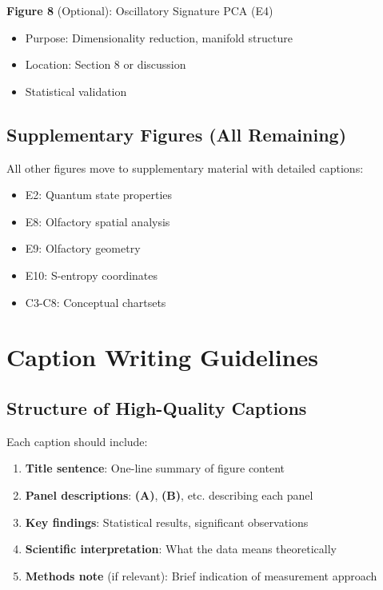 \documentclass[11pt]{article}
\begin{document}
\textbf{Figure 8} (Optional): Oscillatory Signature PCA (E4)
\begin{itemize}
\item Purpose: Dimensionality reduction, manifold structure
\item Location: Section 8 or discussion
\item Statistical validation
\end{itemize}

\subsection{Supplementary Figures (All Remaining)}

All other figures move to supplementary material with detailed captions:
\begin{itemize}
\item E2: Quantum state properties
\item E8: Olfactory spatial analysis
\item E9: Olfactory geometry
\item E10: S-entropy coordinates
\item C3-C8: Conceptual chartsets
\end{itemize}

\newpage

\section{Caption Writing Guidelines}

\subsection{Structure of High-Quality Captions}

Each caption should include:

\begin{enumerate}
\item \textbf{Title sentence}: One-line summary of figure content
\item \textbf{Panel descriptions}: \textbf{(A)}, \textbf{(B)}, etc. describing each panel
\item \textbf{Key findings}: Statistical results, significant observations
\item \textbf{Scientific interpretation}: What the data means theoretically
\item \textbf{Methods note} (if relevant): Brief indication of measurement approach
\end{enumerate}
\end{document}
